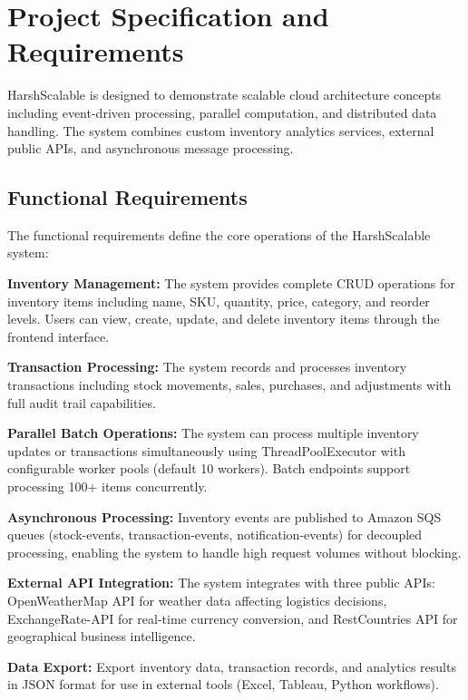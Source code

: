 \documentclass[conference]{IEEEtran}
\begin{document}
\section{Project Specification and Requirements}
\label{sec:requirements}

HarshScalable is designed to demonstrate scalable cloud architecture concepts including event-driven processing, parallel computation, and distributed data handling. The system combines custom inventory analytics services, external public APIs, and asynchronous message processing.

\subsection{Functional Requirements}

The functional requirements define the core operations of the HarshScalable system:

\textbf{Inventory Management:} The system provides complete CRUD operations for inventory items including name, SKU, quantity, price, category, and reorder levels. Users can view, create, update, and delete inventory items through the frontend interface.

\textbf{Transaction Processing:} The system records and processes inventory transactions including stock movements, sales, purchases, and adjustments with full audit trail capabilities.

\textbf{Parallel Batch Operations:} The system can process multiple inventory updates or transactions simultaneously using ThreadPoolExecutor with configurable worker pools (default 10 workers). Batch endpoints support processing 100+ items concurrently.

\textbf{Asynchronous Processing:} Inventory events are published to Amazon SQS queues (stock-events, transaction-events, notification-events) for decoupled processing, enabling the system to handle high request volumes without blocking.

\textbf{External API Integration:} The system integrates with three public APIs: OpenWeatherMap API for weather data affecting logistics decisions, ExchangeRate-API for real-time currency conversion, and RestCountries API for geographical business intelligence.

\textbf{Data Export:} Export inventory data, transaction records, and analytics results in JSON format for use in external tools (Excel, Tableau, Python workflows).
\end{document}
